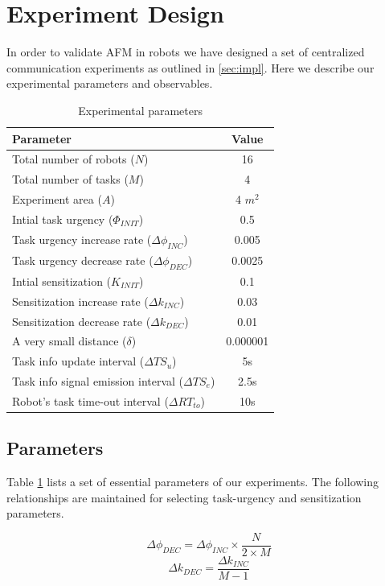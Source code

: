 \documentclass{llncs}
\begin{document}
\section{Experiment Design}
\label{sec:expt-design}
In order to validate AFM in robots we have designed a set of centralized communication experiments as outlined in \ref{sec:impl}. Here we describe our experimental parameters
and observables.
%
\begin{table}
\caption{Experimental parameters}
\label{table:params}
\begin{center}
\begin{tabular}{|l||c|}
\hline Parameter & Value\\
\hline Total number of robots ($N$) & 16\\
\hline Total number of tasks ($M$) & 4\\
\hline Experiment area ($A$) & 4 $m^2$\\
\hline Intial task urgency ($\Phi_{INIT}$) & 0.5\\
\hline Task urgency increase rate ($\Delta\phi_{INC}$) & 0.005\\
\hline Task urgency decrease rate ($\Delta\phi_{DEC}$) & 0.0025\\
\hline Intial sensitization ($K_{INIT}$) & 0.1\\
\hline Sensitization increase rate ($\Delta k_{INC}$) & 0.03\\
\hline Sensitization decrease rate ($\Delta k_{DEC}$) & 0.01\\
\hline A very small distance ($\delta$)& 0.000001\\
\hline Task info update interval ($\Delta TS_{u}$) & 5s\\
\hline Task info signal emission interval ($ \Delta TS_{e}$)& 2.5s\\
\hline Robot's task time-out interval ($\Delta RT_{to} $)& 10s\\
\hline
\end{tabular}
\end{center}
\end{table}
% 
\subsection{Parameters}
Table \ref{table:params} lists a set of essential parameters of our experiments. The following relationships are maintained for selecting task-urgency and sensitization parameters.
\begin{small}
\begin{equation}
\Delta\phi_{DEC} = \Delta\phi_{INC} \times \frac{N}{2 \times M}
\label{eqn:task-urgency}
\end{equation}
%
\begin{equation}
\Delta k_{DEC} = \frac{\Delta k_{INC}} {M - 1} 
\label{eqn:sensitization}
\end{equation}
\end{small}
%
\end{document}
